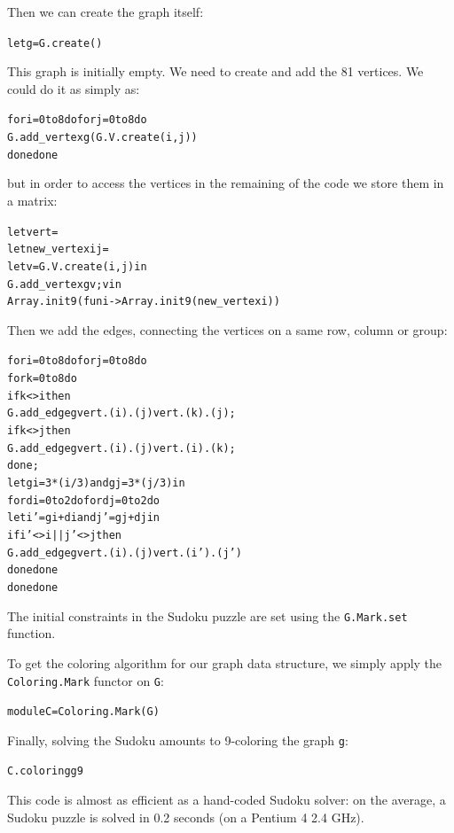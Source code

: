\documentclass[]{tfp05symp}
\begin{document}
Then we can create the graph itself:
\begin{alltt}
let g = G.create ()
\end{alltt}
This graph is initially empty. We need to create and add the 81
vertices. We could do it as simply as:
\begin{alltt}
for i = 0 to 8 do for j = 0 to 8 do 
  G.add_vertex g (G.V.create (i,j))
done done
\end{alltt}
but in order to access the vertices in the remaining of the code we
store them in a matrix:
\begin{alltt}
let vert = 
  let new_vertex i j = 
    let v = G.V.create (i, j) in 
    G.add_vertex g v; v in
  Array.init 9 (fun i -> Array.init 9 (new_vertex i))
\end{alltt}
Then we add the edges, connecting the vertices on a same row, column or group:
\begin{alltt}
for i = 0 to 8 do for j = 0 to 8 do
  for k = 0 to 8 do
    if k <> i then 
      G.add_edge g vert.(i).(j) vert.(k).(j);
    if k <> j then 
      G.add_edge g vert.(i).(j) vert.(i).(k);
  done;
  let gi = 3 * (i / 3) and gj = 3 * (j / 3) in
  for di = 0 to 2 do for dj = 0 to 2 do
    let i' = gi + di and j' = gj + dj in
    if i' <> i || j' <> j then 
      G.add_edge g vert.(i).(j) vert.(i').(j')
  done done
done done
\end{alltt}
The initial constraints in the Sudoku puzzle are set using the
\texttt{G.Mark.set} function.

To get the coloring algorithm for our graph data structure, we simply
apply the \texttt{Coloring.Mark} functor on \texttt{G}:
\begin{alltt}
module C = Coloring.Mark(G)
\end{alltt}
Finally, solving the Sudoku amounts to 9-coloring the graph \texttt{g}:
\begin{alltt}
C.coloring g 9
\end{alltt}

This code is almost as efficient as a hand-coded Sudoku solver: on the
average, a Sudoku puzzle is solved in 0.2 seconds (on a Pentium 4 2.4 GHz).
\end{document}
